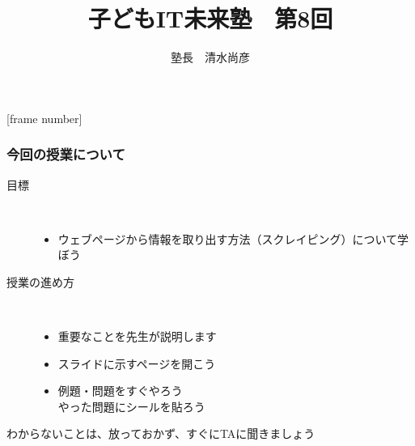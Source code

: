 
\graphicspath{%
{./slide08-img/}%
{./text08-img/}%
}



[frame number]
\title{子どもIT未来塾　第8回}
\author{塾長　清水尚彦}

\def\quiz{1}


\begin{frame}[fragile]
	\frametitle{今回の授業について ~~~}
		\begin{description}
			\item[目標] ~\\
				\begin{itemize}
					\item ウェブページから情報を取り出す方法（スクレイピング）について学ぼう
				\end{itemize}

			\item[授業の進め方]~\\
				\begin{itemize}
					\item 重要なことを先生が説明します
					\item スライドに示すページを開こう
					\item 例題・問題をすぐやろう\\
						やった問題にシールを貼ろう
				\end{itemize}
		\end{description}
		\vfill
		わからないことは、放っておかず、すぐにTAに聞きましょう
\end{frame}

